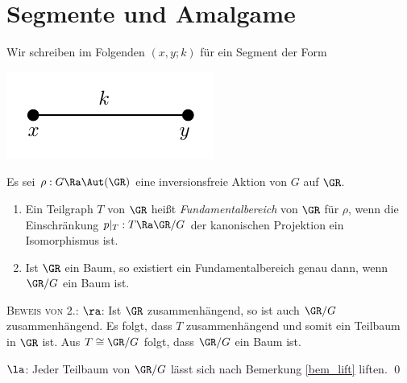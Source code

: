 \section{Segmente und Amalgame}\label{sec_seg}

Wir schreiben im Folgenden $(x,y;k)$ für ein Segment
der Form
\begin{center}
	\includegraphics{grugraImages/segment}
\end{center}

\DB Es sei $\rho:G\Ra\Aut(\GR)$ eine inversionsfreie Aktion von $G$
auf $\GR$.
\begin{enumerate}
\item Ein Teilgraph $T$ von $\GR$ heißt \emph{Fundamentalbereich}
von $\GR$ für $\rho$, wenn die Einschränkung
$p|_T : T \Ra \GR/G$
der kanonischen Projektion ein Isomorphismus ist.
\item Ist $\GR$ ein Baum, so existiert ein Fundamentalbereich genau
dann, wenn $\GR/G$ ein Baum ist.
\end{enumerate}
\textsc{Beweis von 2.:} \glqq$\ra$\grqq: Ist $\GR$ zusammenhängend,
so ist auch $\GR/G$ zusammenhängend. Es folgt, dass $T$ 
zusammenhängend und somit ein Teilbaum in $\GR$ ist.
Aus $T\cong \GR/G$ folgt, dass $\GR/G$ ein Baum ist.

\glqq$\la$\grqq: Jeder Teilbaum von $\GR/G$ lässt sich nach
Bemerkung \ref{bem_lift} liften.
\qed


